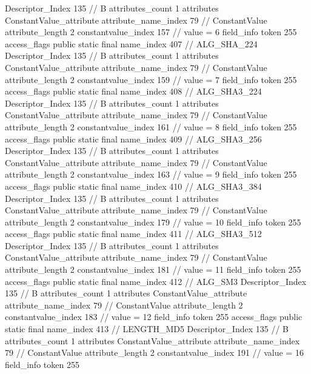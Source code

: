 {{{{{				Descriptor_Index	135		// B
				attributes_count	1
				attributes {
				ConstantValue_attribute {
					attribute_name_index	79		// ConstantValue
					attribute_length	2
					constantvalue_index	157		// value = 6
				}
				}
			}
			field_info {
				token	255
				access_flags	public static final
				name_index	407		// ALG_SHA_224
				Descriptor_Index	135		// B
				attributes_count	1
				attributes {
				ConstantValue_attribute {
					attribute_name_index	79		// ConstantValue
					attribute_length	2
					constantvalue_index	159		// value = 7
				}
				}
			}
			field_info {
				token	255
				access_flags	public static final
				name_index	408		// ALG_SHA3_224
				Descriptor_Index	135		// B
				attributes_count	1
				attributes {
				ConstantValue_attribute {
					attribute_name_index	79		// ConstantValue
					attribute_length	2
					constantvalue_index	161		// value = 8
				}
				}
			}
			field_info {
				token	255
				access_flags	public static final
				name_index	409		// ALG_SHA3_256
				Descriptor_Index	135		// B
				attributes_count	1
				attributes {
				ConstantValue_attribute {
					attribute_name_index	79		// ConstantValue
					attribute_length	2
					constantvalue_index	163		// value = 9
				}
				}
			}
			field_info {
				token	255
				access_flags	public static final
				name_index	410		// ALG_SHA3_384
				Descriptor_Index	135		// B
				attributes_count	1
				attributes {
				ConstantValue_attribute {
					attribute_name_index	79		// ConstantValue
					attribute_length	2
					constantvalue_index	179		// value = 10
				}
				}
			}
			field_info {
				token	255
				access_flags	public static final
				name_index	411		// ALG_SHA3_512
				Descriptor_Index	135		// B
				attributes_count	1
				attributes {
				ConstantValue_attribute {
					attribute_name_index	79		// ConstantValue
					attribute_length	2
					constantvalue_index	181		// value = 11
				}
				}
			}
			field_info {
				token	255
				access_flags	public static final
				name_index	412		// ALG_SM3
				Descriptor_Index	135		// B
				attributes_count	1
				attributes {
				ConstantValue_attribute {
					attribute_name_index	79		// ConstantValue
					attribute_length	2
					constantvalue_index	183		// value = 12
				}
				}
			}
			field_info {
				token	255
				access_flags	public static final
				name_index	413		// LENGTH_MD5
				Descriptor_Index	135		// B
				attributes_count	1
				attributes {
				ConstantValue_attribute {
					attribute_name_index	79		// ConstantValue
					attribute_length	2
					constantvalue_index	191		// value = 16
				}
				}
			}
			field_info {
				token	255
}}}}}
